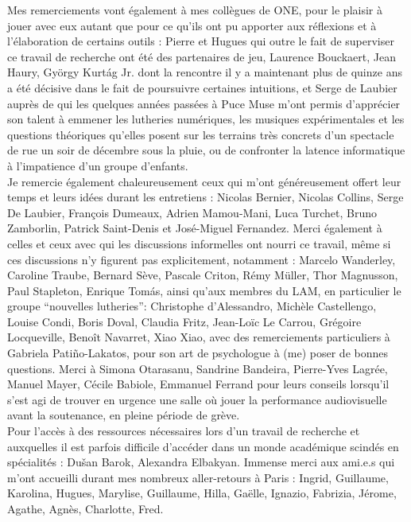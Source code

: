\indent Mes remerciements vont également à mes collègues de ONE, pour le plaisir à jouer avec eux autant que pour ce qu'ils ont pu apporter aux réflexions et à l'élaboration de certains outils : Pierre et Hugues qui outre le fait de superviser ce travail de recherche ont été des partenaires de jeu, Laurence Bouckaert, Jean Haury, György Kurtág Jr. dont la rencontre il y a maintenant plus de quinze ans a été décisive dans le fait de poursuivre certaines intuitions, et Serge de Laubier auprès de qui les quelques années passées à Puce Muse m'ont permis d'apprécier son talent à emmener les lutheries numériques, les musiques expérimentales et les questions théoriques qu'elles posent sur les terrains très concrets d'un spectacle de rue un soir de décembre sous la pluie, ou de confronter la latence informatique à l'impatience d'un groupe d'enfants.\\
\indent Je remercie également chaleureusement ceux qui m'ont généreusement offert leur temps et leurs idées durant les entretiens : Nicolas Bernier, Nicolas Collins, Serge De Laubier, François Dumeaux, Adrien Mamou-Mani, Luca Turchet, Bruno Zamborlin, Patrick Saint-Denis et José-Miguel Fernandez. Merci également à celles et ceux avec qui les discussions informelles ont nourri ce travail, même si ces discussions n'y figurent pas explicitement, notamment : Marcelo Wanderley, Caroline Traube, Bernard Sève, Pascale Criton, Rémy Müller, Thor Magnusson, Paul Stapleton, Enrique Tomás, ainsi qu'aux membres du LAM, en particulier le groupe ``nouvelles lutheries'': Christophe d'Alessandro, Michèle Castellengo, Louise Condi, Boris Doval, Claudia Fritz, Jean-Loïc Le Carrou, Grégoire Locqueville, Benoît Navarret, Xiao Xiao, avec des remerciements particuliers à Gabriela Patiño-Lakatos, pour son art de psychologue à (me) poser de bonnes questions. Merci à Simona Otarasanu, Sandrine Bandeira, Pierre-Yves Lagrée, Manuel Mayer, Cécile Babiole, Emmanuel Ferrand pour leurs conseils lorsqu'il s'est agi de trouver en urgence une salle où jouer la performance audiovisuelle avant la soutenance, en pleine période de grève.\\
\indent Pour l'accès à des ressources nécessaires lors d'un travail de recherche et auxquelles il est parfois difficile d'accéder dans un monde académique scindés en spécialités : Dušan Barok, Alexandra Elbakyan.
\indent Immense merci aux ami.e.s qui m'ont accueilli durant mes nombreux aller-retours à Paris : Ingrid, Guillaume, Karolina, Hugues, Marylise, Guillaume, Hilla, Gaëlle, Ignazio, Fabrizia, Jérome, Agathe, Agnès, Charlotte, Fred.

